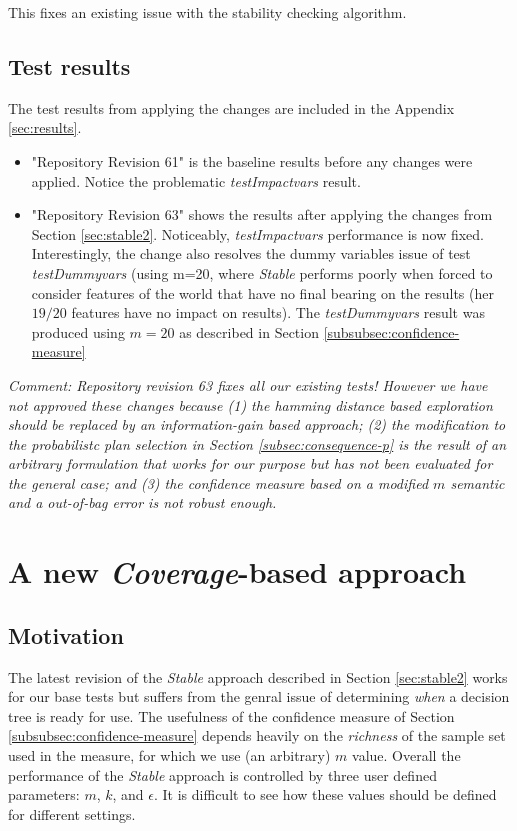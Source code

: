 \documentclass[a4paper]{article}
\newcommand{\st}{\emph{Stable}\xspace}
\newcommand{\cov}{\emph{Coverage}\xspace}
\newcommand{\tiv}{\emph{testImpactvars}\xspace}
\newcommand{\dt}{{decision tree}\xspace}
\begin{document}
This fixes an existing issue with the stability checking algorithm.

\subsection{Test results}
The test results from applying the changes are included in the Appendix \ref{sec:results}.
\begin{itemize}
\item "Repository Revision 61" is the baseline results before any changes were applied. Notice the problematic \tiv result.
\item "Repository Revision 63" shows the results after applying the changes from Section \ref{sec:stable2}. Noticeably, \tiv performance is now fixed. Interestingly, the change also resolves the dummy variables issue of test \textit{testDummyvars} (using m=20, where \st performs poorly when forced to consider features of the world that have no final bearing on the results (her $19/20$ features have no impact on results). The \textit{testDummyvars} result was produced using $m=20$ as described in Section \ref{subsubsec:confidence-measure}
\end{itemize}

\textit{Comment: Repository revision 63 fixes all our existing tests! However we have not approved these changes because (1) the hamming distance based exploration should be replaced by an information-gain based approach; (2) the modification to the probabilistc plan selection in Section \ref{subsec:consequence-p} is the result of an arbitrary formulation that works for our purpose but has not been evaluated for the general case; and (3) the confidence measure based on a modified $m$ semantic and a out-of-bag error is not robust enough. }


\section{A new {\cov}-based approach}
\label{sec:coverage1}
\subsection{Motivation}

The latest revision of the \st approach described in Section \ref{sec:stable2} works for our base tests but suffers from the genral issue of determining \textit{when} a \dt is ready for use. The usefulness of the confidence measure of Section \ref{subsubsec:confidence-measure} depends heavily on the \textit{richness} of the sample set used in the measure, for which we use (an arbitrary) $m$ value. Overall the performance of the \st approach is controlled by three user defined parameters: $m$, $k$, and $\epsilon$. It is difficult to see how these values should be defined for different settings. 
\end{document}
